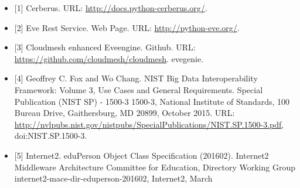 \documentclass[9pt,]{article}
\begin{document}
\begin{itemize}
\item
  {[}1{]} Cerberus. URL: \url{http://docs.python-cerberus.org/}.
\item
  {[}2{]} Eve Rest Service. Web Page. URL: \url{http://python-eve.org/}.
\item
  {[}3{]} Cloudmesh enhanced Eveengine. Github. URL:
  \url{https://github.com/cloudmesh/cloudmesh}. evegenie.
\item
  {[}4{]} Geoffrey C. Fox and Wo Chang. NIST Big Data Interoperability
  Framework: Volume 3, Use Cases and General Requirements. Special
  Publication (NIST SP) - 1500-3 1500-3, National Institute of
  Standards, 100 Bureau Drive, Gaithersburg, MD 20899, October 2015.
  URL:
  \url{http://nvlpubs.nist.gov/nistpubs/SpecialPublications/NIST.SP.1500-3.pdf},
  doi:NIST.SP.1500-3.
\item
  {[}5{]} Internet2. eduPerson Object Class Specification (201602).
  Internet2 Middleware Architecture Committee for Education, Directory
  Working Group internet2-mace-dir-eduperson-201602, Internet2, March


\end{itemize}
\end{document}
